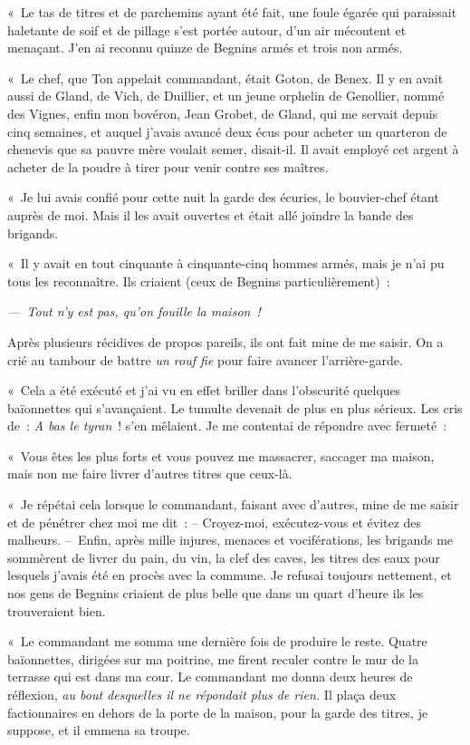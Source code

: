 \documentclass[french,twoside]{book} %
\newenvironment{quoteblock}%
  {\begin{quoting}}
  {\end{quoting}}
\newenvironment{quotebar}{%
    \def\FrameCommand{{\color{rubric!10!}\vrule width 0.5em} \hspace{0.9em}}%
    \def\OuterFrameSep{\itemsep} %
    \MakeFramed {\advance\hsize-\width \FrameRestore}
  }%
  {%
    \endMakeFramed
  }
\renewenvironment{quoteblock}%
  {%
    \savenotes
    \setstretch{0.9}
    \normalfont
    \begin{quotebar}
  }
  {%
    \end{quotebar}
    \spewnotes
  }
\begin{document}
\begin{quoteblock}
 « Le tas de titres et de parchemins ayant été fait, une foule égarée qui paraissait haletante de soif et de pillage s’est portée autour, d’un air mécontent et menaçant. J’en ai reconnu quinze de Begnins armés et trois non armés.\par
 « Le chef, que Ton appelait commandant, était Goton, de Benex. Il y en avait aussi de Gland, de Vich, de Duillier, et un jeune orphelin de Genollier, nommé des Vignes, enfin mon bovéron, Jean Grobet, de Gland, qui me servait depuis cinq semaines, et auquel j’avais avancé deux écus pour acheter un quarteron de chenevis que sa pauvre mère voulait semer, disait-il. Il avait employé cet argent à acheter de la poudre à tirer pour venir contre ses maîtres.\par
 « Je lui avais confié pour cette nuit la garde des écuries, le bouvier-chef étant auprès de moi. Mais il les avait ouvertes et était allé joindre la bande des brigands.\par
 « Il y avait en tout cinquante à cinquante-cinq hommes armés, mais je n’ai pu tous les reconnaître. Ils criaient (ceux de Begnins particulièrement) :\par
 {\itshape — Tout n’y est pas, qu’on fouille la maison !}\par
 Après plusieurs récidives de propos pareils, ils ont fait mine de me saisir. On a crié au tambour de battre \emph{un rouf fie} pour faire avancer l’arrière-garde.\par
 « Cela a été exécuté et j’ai vu en effet briller dans l’obscurité quelques baïonnettes qui s’avançaient. Le tumulte devenait de plus en plus sérieux. Les cris de : \emph{A bas le tyran} ! s’en mêlaient. Je me contentai de répondre avec fermeté :\par
 « Vous êtes les plus forts et vous pouvez me massacrer, saccager ma maison, mais non me faire livrer d’autres titres que ceux-là.\par
 « Je répétai cela lorsque le commandant, faisant avec d’autres, mine de me saisir et de pénétrer chez moi me dit : – Croyez-moi, exécutez-vous et évitez des malheurs. – Enfin, après mille injures, menaces et vociférations, les brigands me sommèrent de livrer du pain, du vin, la clef des caves, les titres des eaux pour lesquels j’avais été en procès avec la commune. Je refusai toujours nettement, et nos gens de Begnins criaient de plus belle que dans un quart d’heure ils les trouveraient bien.\par
 « Le commandant me somma une dernière fois de produire le reste. Quatre baïonnettes, dirigées sur ma poitrine, me firent reculer contre le mur de la terrasse qui est dans ma cour. Le commandant me donna deux heures de réflexion, \emph{au bout desquelles il ne répondait plus de rien.} Il plaça deux factionnaires en dehors de la porte de la maison, pour la garde des titres, je suppose, et il emmena sa troupe.\par

\end{quoteblock}
\end{document}
